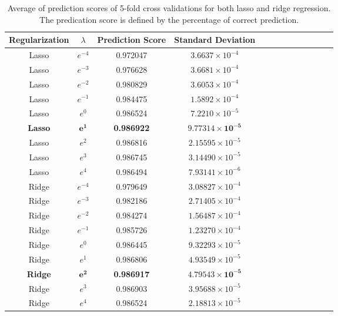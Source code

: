 \documentclass[conference]{IEEEtran}
\begin{document}
\begin{table}[h!] 
 \caption{Average of prediction scores of 5-fold cross validations for both lasso and ridge regression. The predication score is defined by the percentage of correct prediction.}
\centering %
\begin{tabular}{c c c c c c rrrrrrr} %
\hline\hline %
	Regularization & 	$\lambda$		&	Prediction Score	&	Standard Deviation		%
\\ [0.5ex] 
\hline 
	Lasso 	& 	$e^{-4}$		&	0.972047 	&	$3.6637 \times 10^{-4}$	\\
	Lasso 	& 	$e^{-3}$		&	0.976628	&
$3.6681 \times 10^{-4}$		\\	
	Lasso 	& 	$e^{-2}$		&	0.980829	&
$3.6053 \times 10^{-4}$           \\	
	Lasso 	& 	$e^{-1}$		&	0.984475	&
$1.5892 \times 10^{-4}$           \\	
	Lasso 	& 	$e^{0}$		&	0.986524	&
$7.2210 \times 10^{-5}$          \\	
	\textbf{Lasso} 	& 	$\mathbf{e^{1}}$		&	\textbf{0.986922}	&
$\mathbf{9.77314 \times 10^{-5}}$          \\	
	Lasso 	& 	$e^{2}$		&	0.986816	&
$2.15595 \times 10^{-5}$           \\	
	Lasso 	& 	$e^{3}$		&	0.986745	&
$3.14490 \times 10^{-5}$           \\	
	Lasso 	& 	$e^{4}$		&	0.986494	&
$7.93141 \times 10^{-6}$           \\	\hline
	Ridge 	& 	$e^{-4}$		&	0.979649	&
$3.08827 \times 10^{-4}$           \\	
	Ridge 	& 	$e^{-3}$		&	0.982186	&
$2.71405 \times 10^{-4}$         \\	
	Ridge 	& 	$e^{-2}$		&	0.984274	&
$1.56487 \times 10^{-4}$           \\	
	Ridge 	& 	$e^{-1}$		&	0.985726	&
$1.23270 \times 10^{-4}$           \\	
	Ridge 	& 	$e^{0}$		&	0.986445	&
$9.32293 \times 10^{-5}$           \\	
	Ridge 	& 	$e^{1}$		&	0.986806	&
$4.93549 \times 10^{-5}$           \\	
	\textbf{Ridge} 	& 	$\mathbf{e^{2}}$		&	\textbf{0.986917}	& 
$\mathbf{4.79543 \times 10^{-5}}$           \\	
	Ridge 	& 	$e^{3}$		&	0.986903	&
$3.95688 \times 10^{-5}$           \\	
	Ridge 	& 	$e^{4}$		&	0.986524	&
$2.18813 \times 10^{-5}$           \\	
\hline \hline %
\end{tabular} 
\label{tab:predictionScores} 
\end{table} 
\end{document}
